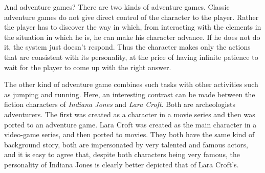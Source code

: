 \documentclass[
		twoside,openright,titlepage,numbers=noenddot,manychapters,
		headinclude,%
                footinclude=false,cleardoublepage=empty,
                BCOR=5mm,
		fontsize=11pt, %
                 enabledeprecatedfontcommands]{scrreprt}
\begin{document}
And adventure games? There are two kinds of adventure games. Classic adventure games do not give direct control of the character to the player. Rather the player has to discover the way in which, from interacting with the elements in the situation in which he is, he can make his character advance. If he does not do it, the system just doesn't respond. Thus the character makes only the actions that are consistent with its personality, at the price of having infinite patience to wait for the player to come up with the right answer.












The other kind of adventure game combines such tasks with other activities such as jumping and running. Here, an interesting contrast can be made between the fiction characters of \emph{Indiana Jones} and \emph{Lara Croft}. Both are archeologists adventurers.%
 The first was created as a  character in a movie series and then was ported to an adventure game. Lara Croft was created as the main character in a video-game series, and then ported to movies. They both have the same kind of background story, both are impersonated by very talented and famous actors, and it is easy to agree that, despite both characters being very famous, the personality of Indiana Jones is clearly better depicted that of Lara Croft's.
\end{document}
